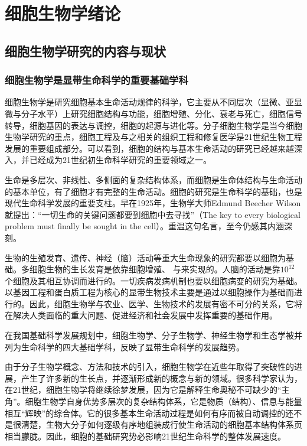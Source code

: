 \chapter{细胞生物学绪论}

\section{细胞生物学研究的内容与现状}

\subsection{细胞生物学是显带生命科学的重要基础学科}

细胞生物学是研究细胞基本生命活动规律的科学，它主要从不同层次（显微、亚显微与分子水平）上研究细胞结构与功能，细胞增殖、分化、衰老与死亡，细胞信号转导，细胞基因的表达与调控，细胞的起源与进化等。分子细胞生物学是当今细胞生物学研究的重点，细胞工程及与之相关的组织工程和修复医学是21世纪生物工程发展的重要组成部分。可以看到，细胞的结构与基本生命活动的研究已经越来越深入，并已经成为21世纪初生命科学研究的重要领域之一。

生命是多层次、非线性、多侧面的复杂结构体系，而细胞是生命体结构与生命活动的基本单位，有了细胞才有完整的生命活动。细胞的研究是生命科学的基础，也是现代生命科学发展的重要支柱。早在1925年，生物学大师Edmund Beecher Wilson就提出：“一切生命的关键问题都要到细胞中去寻找”（The key to every biological problem must finally be sought in the cell）。重温这句名言，至今仍感其内涵深刻。

生物的生殖发育、遗传、神经（脑）活动等重大生命现象的研究都要以细胞为基础。多细胞生物的生长发育是依靠细胞增殖、 与来实现的。人脑的活动是靠$ 10^{{12}} $个细胞及其相互协调而进行的。一切疾病发病机制也要以细胞病变的研究为基础。以基因工程和蛋白质工程为核心的显带生物技术主要是通过以细胞操作为基础而进行的。因此，细胞生物学与农业、医学、生物技术的发展有密不可分的关系，它将在解决人类面临的重大问题、促进经济和社会发展中发挥重要的基础作用。

在我国基础科学发展规划中，细胞生物学、分子生物学、神经生物学和生态学被并列为生命科学的四大基础学科，反映了显带生命科学的发展趋势。

由于分子生物学概念、方法和技术的引入，细胞生物学在近些年取得了突破性的进展，产生了许多新的生长点，并逐渐形成新的概念与新的领域。很多科学家认为，在21世纪，细胞生物学将继续徐梦发展，因为它是解释生命奥秘不可缺少的``主角''。细胞生物学自身优势多层次的复杂结构体系，它是物质（结构）、信息与能量相互``辉映''的综合体。它的很多基本生命活动过程是如何有序而被自动调控的还不是很清楚，生物大分子如何逐级有序地组装成行使生命活动的细胞基本结构体系页相当朦胧。因此，细胞的基础研究势必影响21世纪生命科学的整体发展速度。


